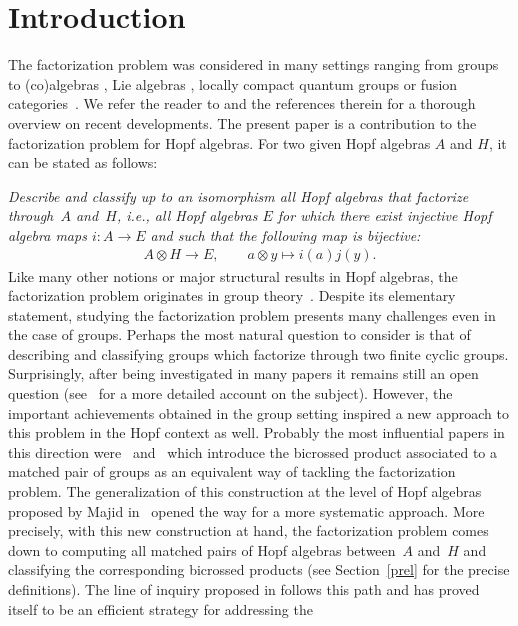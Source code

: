 \documentclass[pdftex]{sigma}
\numberwithin{equation}{section}
\begin{document}
\section{Introduction}
The factorization problem was considered in many settings ranging from groups \cite{acim, Ore, Takeuchi} to (co)algebras \cite{cap, CIMZ, Pena2}, Lie algebras \cite{majid3, Mic}, locally compact quantum groups \cite{VV} or fusion categories~\cite{SG}. We refer the reader to \cite{abm} and the references therein for a thorough overview on recent developments. The present paper is a contribution to the factorization problem for Hopf algebras. For two given Hopf algebras $A$ and $H$, it can be stated as follows:

\textit{Describe and classify up to an isomorphism all Hopf algebras that factorize through~$A$ and~$H$, i.e., all Hopf algebras $E$ for which there exist injective Hopf algebra maps $i\colon A \to E$ and  such that the following map is bijective:}
\begin{gather*}
A \otimes H \to E, \qquad a \otimes y \mapsto i(a) j(y).
\end{gather*}
Like many other notions or major structural results in Hopf algebras, the factorization problem originates in group theory~\cite{Ore}. Despite its elementary statement, studying the factorization problem presents many challenges even in the case of groups. Perhaps the most natural question to consider is that of describing and classifying groups which factorize through two finite cyclic groups. Surprisingly, after being investigated in
many papers it remains still an open question (see~\cite{acim} for a more detailed account on the subject). However, the important achievements obtained in the group setting inspired a new approach to this problem in the Hopf context as well. Probably the most influential papers in this direction were~\cite{zappa} and~\cite{Takeuchi} which introduce the bicrossed product associated to a matched pair of groups as an equivalent way of tackling the factorization problem. The generalization of this construction at the level of Hopf algebras proposed by Majid in~\cite{majid}
opened the way for a more systematic approach. More precisely, with this new construction at hand, the factorization problem comes down to computing all matched pairs of Hopf algebras between~$A$ and~$H$ and classifying the corresponding bicrossed products (see Section~\ref{prel} for the precise definitions). The line of inquiry proposed in \cite{abm} follows this path and has proved itself to be an efficient strategy for addressing the
\end{document}
